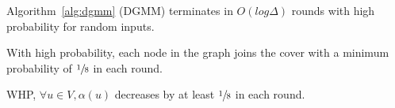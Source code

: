 \begin{lem}
\label{lem:dgmm-log}
Algorithm~\ref{alg:dgmm} (DGMM) terminates in $O(log \Delta)$ rounds with high probability for random inputs.
\end{lem}




\begin{IEEEproof}
\begin{Proposition}
\label{prop:dgmm-log-each}
With high probability, each node in the graph joins the cover with a minimum probability of $\sfrac{1}{8}$ in each round.
\end{Proposition}
\begin{Proposition}
\label{prop:dgmm-log-alpha}
WHP, $\forall u \in V, \alpha(u)$ decreases by at least $\sfrac{1}{8}$ in each round.
\end{Proposition}
\begin{IEEEproof}

\end{IEEEproof}
\end{IEEEproof} 
